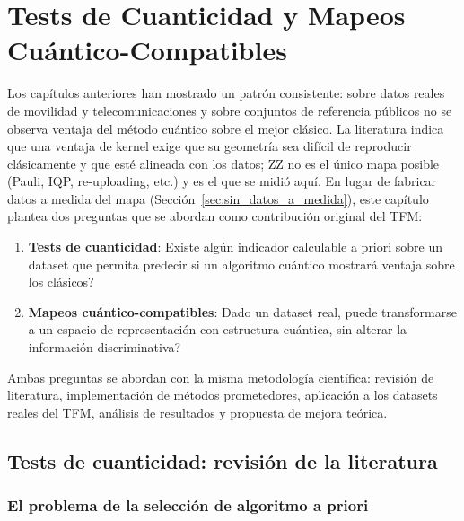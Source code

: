 \chapter{Tests de Cuanticidad y Mapeos Cuántico-Compatibles}
\label{cap:investigacion_original}

Los capítulos anteriores han mostrado un patrón consistente: sobre datos reales de movilidad y telecomunicaciones y sobre conjuntos de referencia públicos no se observa ventaja del método cuántico sobre el mejor clásico. La literatura \citep{huang2021, liu2021} indica que una ventaja de kernel exige que su geometría sea difícil de reproducir clásicamente y que esté alineada con los datos; ZZ no es el único mapa posible (Pauli, IQP, re-uploading, etc.) y es el que se midió aquí. En lugar de fabricar datos a medida del mapa (Sección~\ref{sec:sin_datos_a_medida}), este capítulo plantea dos preguntas que se abordan como contribución original del TFM:

\begin{enumerate}
    \item \textbf{Tests de cuanticidad}: \textquestiondown{}Existe algún indicador calculable a priori sobre un dataset que permita predecir si un algoritmo cuántico mostrará ventaja sobre los clásicos?
    \item \textbf{Mapeos cuántico-compatibles}: Dado un dataset real, \textquestiondown{}puede transformarse a un espacio de representación con estructura cuántica, sin alterar la información discriminativa?
\end{enumerate}

Ambas preguntas se abordan con la misma metodología científica: revisión de literatura, implementación de métodos prometedores, aplicación a los datasets reales del TFM, análisis de resultados y propuesta de mejora teórica.

\section{Tests de cuanticidad: revisión de la literatura}
\label{sec:lit_cuanticidad}

\subsection{El problema de la selección de algoritmo a priori}

